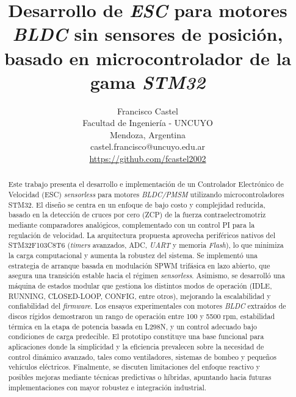 \documentclass[conference]{IEEEtran}
\begin{document}
\title{Desarrollo de \textit{ESC} para motores \textit{BLDC} sin sensores de posición, basado en microcontrolador de la gama \textit{STM32}}

\author{Francisco Castel\\\normalsize Facultad de Ingeniería - UNCUYO \\\normalsize Mendoza, Argentina\\\normalsize castel.francisco@uncuyo.edu.ar \\\normalsize\url{https://github.com/fcastel2002}}

\maketitle


\begin{abstract}
Este trabajo presenta el desarrollo e implementación de un Controlador Electrónico de Velocidad (ESC) \textit{sensorless} para motores \textit{BLDC/PMSM} utilizando microcontroladores STM32. El diseño se centra en un enfoque de bajo costo y complejidad reducida, basado en la detección de cruces por cero (ZCP) de la fuerza contraelectromotriz mediante comparadores analógicos, complementado con un control PI para la regulación de velocidad. La arquitectura propuesta aprovecha periféricos nativos del STM32F103C8T6 (\textit{timers} avanzados, ADC, \textit{UART} y memoria \textit{Flash}), lo que minimiza la carga computacional y aumenta la robustez del sistema. Se implementó una estrategia de arranque basada en modulación SPWM trifásica en lazo abierto, que asegura una transición estable hacia el régimen \textit{sensorless}. Asimismo, se desarrolló una máquina de estados modular que gestiona los distintos modos de operación (IDLE, RUNNING, CLOSED-LOOP, CONFIG, entre otros), mejorando la escalabilidad y confiabilidad del \textit{firmware}. Los ensayos experimentales con motores \textit{BLDC} extraídos de discos rígidos demostraron un rango de operación entre 100 y 5500 rpm, estabilidad térmica en la etapa de potencia basada en L298N, y un control adecuado bajo condiciones de carga predecible. El prototipo constituye una base funcional para aplicaciones donde la simplicidad y la eficiencia prevalecen sobre la necesidad de control dinámico avanzado, tales como ventiladores, sistemas de bombeo y pequeños vehículos eléctricos. Finalmente, se discuten limitaciones del enfoque reactivo y posibles mejoras mediante técnicas predictivas o híbridas, apuntando hacia futuras implementaciones con mayor robustez e integración industrial.
\end{abstract}





\end{document}
